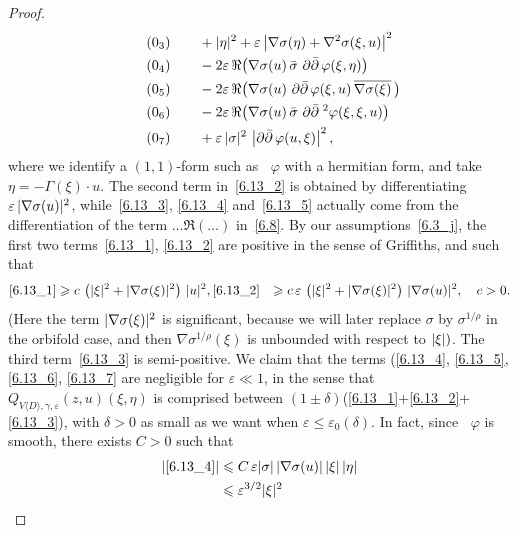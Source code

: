 \documentclass[10pt,a4paper]{article}
\DeclareMathOperator{\ddbar}{\partial\bar\partial}
\DeclarePairedDelimiter{\abs}{\lvert}{\rvert}
\let\leq\leqslant
\let\geq\geqslant
\numberwithin{equation}{section}
\begin{document}
\begin{proof}
\begin{align}
\tag{$\theequation_3$}\label{6.13_3}
&\qquad +\abs{\eta}^2+\varepsilon\,
\abs*{\nabla\sigma(\eta)+\nabla^2\sigma(\xi,u)}^2
\\
\tag{$\theequation_4$}\label{6.13_4}
&\qquad -2\varepsilon\,\Re\big(
\nabla\sigma(u)\,\bar\sigma\,\ddbar\varphi(\xi,\eta)\big)
\\
\tag{$\theequation_5$}\label{6.13_5}
&\qquad -2\varepsilon\,\Re\big(
\nabla\sigma(u)\,\ddbar\varphi(\xi,u)\,
\overline{\nabla\sigma(\xi)}\,\big)
\\
\tag{$\theequation_6$}\label{6.13_6}
&\qquad -2\varepsilon\,\Re\big(
\nabla\sigma(u)\,\bar\sigma\,\ddbar{\kern1pt}^2
\varphi(\xi,\xi,u)\big)
\\
\tag{$\theequation_7$}\label{6.13_7}
&\qquad +\varepsilon\,\abs{\sigma}^2\,\left|\ddbar\varphi(u,\xi)\right|^2,
\end{align}
where we identify a $(1,1)$-form such as $\ddbar\varphi$ with a hermitian form, and take $\eta=-\Gamma(\xi)\cdot u$. The second term in~\eqref{6.13_2} is obtained by differentiating
$\varepsilon\,\abs{\nabla\sigma(u)}^2$, while~\eqref{6.13_3}, \eqref{6.13_4} and~\eqref{6.13_5} actually come from the differentiation of the term $\dots\Re(\dots)$ in~\eqref{6.8}. By our assumptions~\eqref{6.3_j}, the first two terms~\eqref{6.13_1}, \eqref{6.13_2} are positive in the sense of Griffiths, and such that
\begin{align*}
\eqref{6.13_1}&\geq c\,\left(\abs{\xi}^2+\abs{\nabla\sigma(\xi)}^2\right)\,\abs{u}^2, \eqref{6.13_2}&\geq c\,\varepsilon\,\left(\abs{\xi}^2+\abs{\nabla\sigma(\xi)}^2\right)\,
\abs{\nabla\sigma(u)}^2,\quad c>0.
\end{align*}
(Here the term $\abs{\nabla\sigma(\xi)}^2$ is significant, because we will later replace $\sigma$ by $\sigma^{1/\rho}$ in the orbifold case, and then $\nabla\sigma^{1/\rho}(\xi)$ is unbounded with respect to $\abs{\xi})$. The third term~\eqref{6.13_3} is semi-positive. We claim that the terms (\ref{6.13_4}, \ref{6.13_5}, \ref{6.13_6}, \ref{6.13_7} are negligible for
$\varepsilon\ll 1$, in the sense that
$Q_{V\langle D\rangle,\gamma,\varepsilon}(z,u)(\xi,\eta)$ is comprised between $(1\pm\delta)$(\eqref{6.13_1}+\eqref{6.13_2}+\eqref{6.13_3}), with $\delta>0$ as small as we want when $\varepsilon\leq\varepsilon_0(\delta)$. In fact, since $\ddbar\varphi$ is smooth, there exists $C>0$ such that
\begin{align*}
\abs*{\eqref{6.13_4}} &\leq C\,\varepsilon\abs{\sigma}\,\abs{\nabla\sigma(u)}\,\abs{\xi}\,\abs{\eta}
\\
&\leq
\varepsilon^{3/2}\abs{\xi}^2

\end{align*}
\end{proof}
\end{document}
